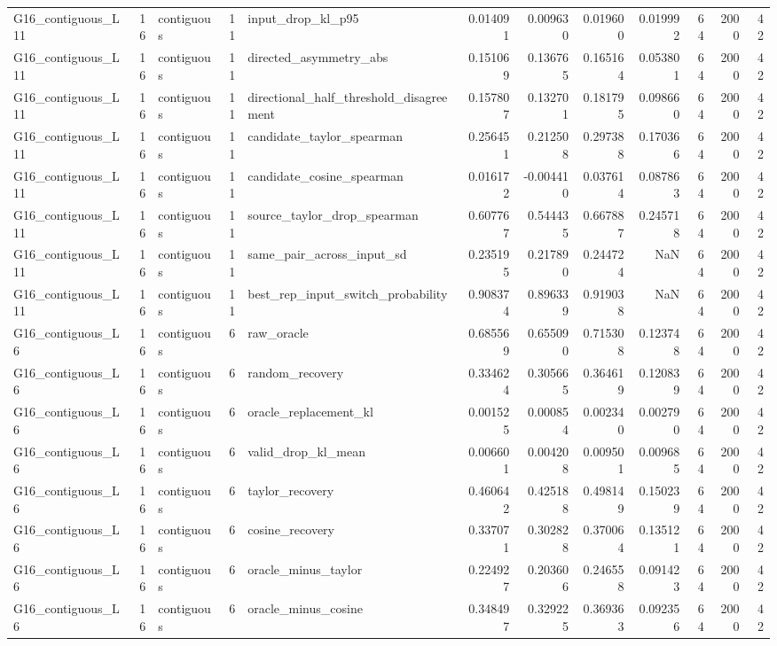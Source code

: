 \begin{tabular}{lrlrlrrrrrrr}
G16_contiguous_L11 & 16 & contiguous & 11 & input_drop_kl_p95 & 0.014091 & 0.009630 & 0.019600 & 0.019992 & 64 & 2000 & 42 \\
G16_contiguous_L11 & 16 & contiguous & 11 & directed_asymmetry_abs & 0.151069 & 0.136765 & 0.165164 & 0.053801 & 64 & 2000 & 42 \\
G16_contiguous_L11 & 16 & contiguous & 11 & directional_half_threshold_disagreement & 0.157807 & 0.132701 & 0.181795 & 0.098660 & 64 & 2000 & 42 \\
G16_contiguous_L11 & 16 & contiguous & 11 & candidate_taylor_spearman & 0.256451 & 0.212508 & 0.297388 & 0.170366 & 64 & 2000 & 42 \\
G16_contiguous_L11 & 16 & contiguous & 11 & candidate_cosine_spearman & 0.016172 & -0.004410 & 0.037614 & 0.087863 & 64 & 2000 & 42 \\
G16_contiguous_L11 & 16 & contiguous & 11 & source_taylor_drop_spearman & 0.607767 & 0.544435 & 0.667887 & 0.245718 & 64 & 2000 & 42 \\
G16_contiguous_L11 & 16 & contiguous & 11 & same_pair_across_input_sd & 0.235195 & 0.217890 & 0.244724 & NaN & 64 & 2000 & 42 \\
G16_contiguous_L11 & 16 & contiguous & 11 & best_rep_input_switch_probability & 0.908374 & 0.896339 & 0.919038 & NaN & 64 & 2000 & 42 \\
G16_contiguous_L6 & 16 & contiguous & 6 & raw_oracle & 0.685569 & 0.655090 & 0.715308 & 0.123748 & 64 & 2000 & 42 \\
G16_contiguous_L6 & 16 & contiguous & 6 & random_recovery & 0.334624 & 0.305665 & 0.364619 & 0.120839 & 64 & 2000 & 42 \\
G16_contiguous_L6 & 16 & contiguous & 6 & oracle_replacement_kl & 0.001525 & 0.000854 & 0.002340 & 0.002790 & 64 & 2000 & 42 \\
G16_contiguous_L6 & 16 & contiguous & 6 & valid_drop_kl_mean & 0.006601 & 0.004208 & 0.009501 & 0.009685 & 64 & 2000 & 42 \\
G16_contiguous_L6 & 16 & contiguous & 6 & taylor_recovery & 0.460642 & 0.425188 & 0.498149 & 0.150239 & 64 & 2000 & 42 \\
G16_contiguous_L6 & 16 & contiguous & 6 & cosine_recovery & 0.337071 & 0.302828 & 0.370064 & 0.135121 & 64 & 2000 & 42 \\
G16_contiguous_L6 & 16 & contiguous & 6 & oracle_minus_taylor & 0.224927 & 0.203606 & 0.246558 & 0.091423 & 64 & 2000 & 42 \\
G16_contiguous_L6 & 16 & contiguous & 6 & oracle_minus_cosine & 0.348497 & 0.329225 & 0.369363 & 0.092356 & 64 & 2000 & 42 \\

\end{tabular}
